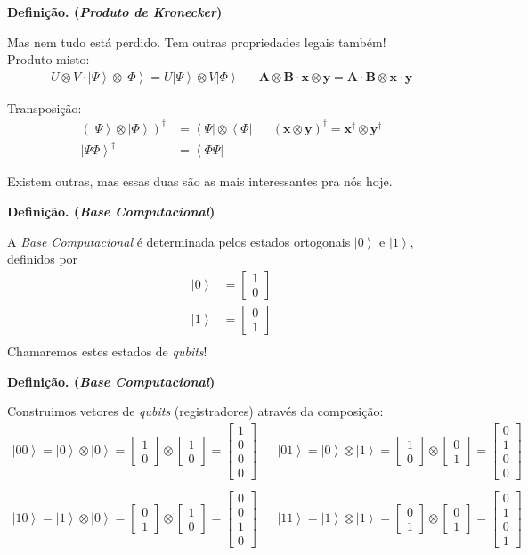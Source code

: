 \documentclass[t]{beamer}
\newcommand{\definicao}[1]{%
	\textbf{Definição. (\emph{#1})\\}
}
\newcommand{\vetor}[2]{\ensuremath{
\left[\begin{matrix}
#1 \\
#2
\end{matrix}\right]
}
}
\newcommand{\vetorx}[4]{\ensuremath{
\left[\begin{matrix}
#1 \\
#2 \\
#3 \\
#4
\end{matrix}\right]
}
}
\newcommand{\ket}[1]{\ensuremath{\left|#1\right\rangle}}
\newcommand{\bra}[1]{\ensuremath{\left\langle#1\right|}}
\begin{document}
	\begin{frame}{\subsecname}
		\definicao{Produto de Kronecker}
		
		Mas nem tudo está perdido. Tem outras propriedades legais também!\\
		
		Produto misto:
		\begin{align*}
			U \otimes V \cdot \ket{\Psi} \otimes \ket{\Phi} = U \ket{\Psi} \otimes V \ket{\Phi} && \mathbf{A} \otimes \mathbf{B} \cdot \mathbf{x} \otimes \mathbf{y} = \mathbf{A} \cdot \mathbf{B} \otimes \mathbf{x} \cdot \mathbf{y}
		\end{align*}
		
		Transposição:
		\begin{align*}
			(\ket{\Psi} \otimes \ket{\Phi})^\dagger &= \bra{\Psi} \otimes \bra{\Phi} && (\mathbf{x} \otimes \mathbf{y})^\dagger = \mathbf{x}^\dagger \otimes \mathbf{y}^\dagger\\
			\ket{\Psi\Phi}^\dagger &= \bra{\Phi\Psi} &&
		\end{align*}
		
		Existem outras, mas essas duas são as mais interessantes pra nós hoje.
	\end{frame}
	
	\begin{frame}{\subsecname}
		\definicao{Base Computacional}
		A \emph{Base Computacional} é determinada pelos estados ortogonais $\ket{0}$ e $\ket{1}$, definidos por
		\begin{align*}
		\ket{0} &= \vetor{1}{0}\\
		\ket{1} &= \vetor{0}{1}\\
		\end{align*}
		Chamaremos estes estados de \textit{qubits}!
	\end{frame}
	
	
	
	\begin{frame}{\subsecname}
		\definicao{Base Computacional}
		Construimos vetores de \textit{qubits} (registradores) através da composição:
		\footnotesize
		\begin{align*}
		\ket{00} = \ket{0} \otimes \ket{0} = \vetor{1}{0} \otimes \vetor{1}{0} = \vetorx{1}{0}{0}{0} &&
		\ket{01} = \ket{0} \otimes \ket{1} = \vetor{1}{0} \otimes \vetor{0}{1} = \vetorx{0}{1}{0}{0} \\
		~\\
		\ket{10} = \ket{1} \otimes \ket{0} = \vetor{0}{1} \otimes \vetor{1}{0} = \vetorx{0}{0}{1}{0} &&
		\ket{11} = \ket{1} \otimes \ket{1} = \vetor{0}{1} \otimes \vetor{0}{1} = \vetorx{0}{1}{0}{1}
		\end{align*}
		\normalsize
	\end{frame}
	
\end{document}
